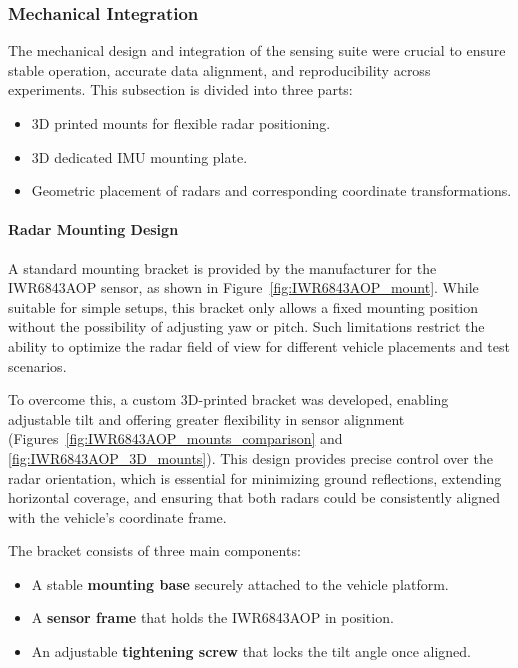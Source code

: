 
\subsubsection{Mechanical Integration}

The mechanical design and integration of the sensing suite were crucial to ensure stable operation, accurate data alignment, and reproducibility across experiments. 
This subsection is divided into three parts:
\begin{itemize}
    \item 3D printed mounts for flexible radar positioning.  
    \item 3D dedicated IMU mounting plate.  
    \item Geometric placement of radars and corresponding coordinate transformations.  
\end{itemize}

\paragraph{Radar Mounting Design}
A standard mounting bracket is provided by the manufacturer for the IWR6843AOP sensor, as shown in Figure~\ref{fig:IWR6843AOP_mount}. 
While suitable for simple setups, this bracket only allows a fixed mounting position without the possibility of adjusting yaw or pitch. 
Such limitations restrict the ability to optimize the radar field of view for different vehicle placements and test scenarios.  

To overcome this, a custom 3D-printed bracket was developed, enabling adjustable tilt and offering greater flexibility in sensor alignment (Figures~\ref{fig:IWR6843AOP_mounts_comparison} and \ref{fig:IWR6843AOP_3D_mounts}). 
This design provides precise control over the radar orientation, which is essential for minimizing ground reflections, extending horizontal coverage, and ensuring that both radars could be consistently aligned with the vehicle’s coordinate frame.  

The bracket consists of three main components:  
\begin{itemize}
    \item A stable \textbf{mounting base} securely attached to the vehicle platform.  
    \item A \textbf{sensor frame} that holds the IWR6843AOP in position.  
    \item An adjustable \textbf{tightening screw} that locks the tilt angle once aligned.  
\end{itemize}

